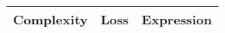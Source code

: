 \begin{center}
        \begin{tabular}{|c|c|c|}
        \hline
        Complexity & Loss & Expression \\
        \hline
        \end{tabular}
        \end{center}
        